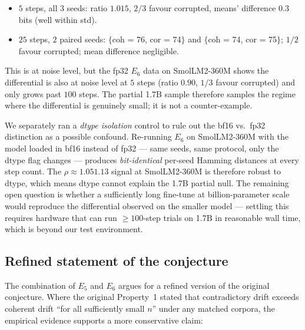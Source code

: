\documentclass[11pt,a4paper]{article}
\begin{document}
\begin{itemize}
  \item $5$ steps, all $3$ seeds: ratio $1.015$, $2/3$ favour
        corrupted, means' difference $0.3$ bits (well within
        std).
  \item $25$ steps, $2$ paired seeds: $\{$coh = 76,
        cor = 74$\}$ and $\{$coh = 74, cor = 75$\}$;
        $1/2$ favour corrupted; mean difference negligible.
\end{itemize}

This is at noise level, but the fp32 $E_6$ data on
SmolLM2\nobreakdash-360M shows the differential is also at noise
level at $5$ steps (ratio $0.90$, $1/3$ favour corrupted) and only
grows past $100$ steps.  The partial 1.7B sample therefore
samples the regime where the differential is genuinely small;
it is not a counter\nobreakdash-example.

We separately ran a \emph{dtype isolation} control to rule out the
bf16 vs.\ fp32 distinction as a possible confound.  Re\nobreakdash-running
$E_6$ on SmolLM2\nobreakdash-360M with the model loaded in bf16
instead of fp32 — same seeds, same protocol, only the dtype
flag changes — produces \emph{bit\nobreakdash-identical}
per\nobreakdash-seed Hamming distances at every step count.  The
$\rho \approx 1.05$\textendash$1.13$ signal at SmolLM2\nobreakdash-360M
is therefore robust to dtype, which means dtype cannot explain
the 1.7B partial null.  The remaining open question is whether a
sufficiently long fine\nobreakdash-tune at billion\nobreakdash-parameter
scale would reproduce the differential observed on the smaller
model — settling this requires hardware that can run
$\geq 100$\nobreakdash-step trials on 1.7B in reasonable wall
time, which is beyond our test environment.

\subsection{Refined statement of the conjecture}
\label{sec:poisoning:refined}

The combination of $E_5$ and $E_6$ argues for a refined version of
the original conjecture.  Where the original
Property~1 stated that contradictory drift exceeds coherent drift
``for all sufficiently small $n$'' under any matched corpora, the
empirical evidence supports a more conservative claim:
\end{document}
